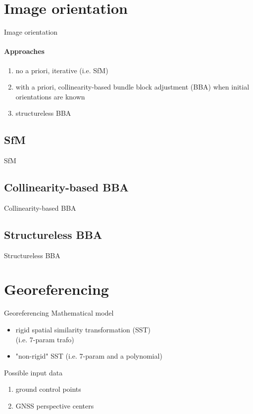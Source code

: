 \documentclass{beamer}
\begin{document}
				 
\section{Image orientation}       
		\begin{frame}{Image orientation}
			\framesubtitle{Approaches}
			\begin{enumerate}
			\item no a priori, iterative (i.e. SfM)
			\item with a priori, collinearity-based bundle block adjustment (BBA) when initial orientations are known 
			\item structureless BBA
			
			\end{enumerate}
		\end{frame}

	\subsection{SfM}	
		\begin{frame}{SfM}
		
		\end{frame}			

	\subsection{Collinearity-based BBA}	
		\begin{frame}{Collinearity-based BBA}
		
		\end{frame}	

	\subsection{Structureless BBA}	
		\begin{frame}{Structureless BBA}
		
		\end{frame}	
		
\section{Georeferencing}
	\begin{frame}{Georeferencing}
		Mathematical model
		\begin{itemize}
		\item rigid spatial similarity transformation (SST) \\(i.e. 7-param trafo)
		\item "non-rigid" SST (i.e. 7-param and a polynomial)
		\end{itemize}
		
		Possible input data 
		\begin{enumerate}
			\item<2-> ground control points
			\item<2-> GNSS perspective centers
		\end{enumerate}
	\end{frame}
\end{document}
